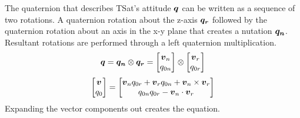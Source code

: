 The quaternion that describes TSat's attitude $\boldsymbol{q}$ can be written as a sequence of two rotations.  A quaternion rotation about the z-axis $\boldsymbol{q_r}$ followed by the quaternion rotation about an axis in the x-y plane that creates a nutation $\boldsymbol{q_n}$.  Resultant rotations are performed through a left quaternion multiplication.
\begin{equation}
  \boldsymbol{q} = \boldsymbol{q_n} \otimes \boldsymbol{q_r} = \begin{bmatrix} \boldsymbol{v}_n \\ q_{0n} \end{bmatrix} \otimes \begin{bmatrix} \boldsymbol{v}_r \\ q_{0r} \end{bmatrix}
\end{equation}
\begin{equation}
  \begin{bmatrix}\boldsymbol{v} \\ q_{0} \end{bmatrix} =
  \begin{bmatrix} \boldsymbol{v}_n q_{0r} + \boldsymbol{v}_r q_{0n} + \boldsymbol{v}_n \times \boldsymbol{v}_r \\  q_{0n} q_{0r} - \boldsymbol{v}_n \cdot \boldsymbol{v}_r \end{bmatrix}
  \label{eqn:rot_nut_product}
\end{equation}
Expanding the vector components out creates the equation.
